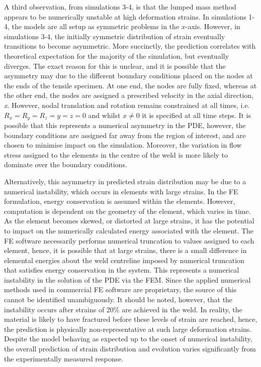 A third observation, from simulations 3-4, is that the lumped mass method appears to be numerically unstable at high deformation strains. In simulations 1-4, the models are all setup as symmetric problems in the $x$-axis. However, in simulations 3-4, the initially symmetric distribution of strain eventually transitions to become asymmetric. More succinctly, the prediction correlates with theoretical expectation for the majority of the simulation, but eventually diverges. The exact reason for this is unclear, and it is possible that the asymmetry may due to the different boundary conditions placed on the nodes at the ends of the tensile specimen. At one end, the nodes are fully fixed, whereas at the other end, the nodes are assigned a prescribed velocity in the axial direction, \textit{x}. However, nodal translation and rotation remains constrained at all times, i.e. $R_x = R_y = R_z = y = z = 0$ and whilst $x \ne 0$ it is specified at all time steps. It is possible that this represents a numerical asymmetry in the PDE, however, the boundary conditions are assigned far away from the region of interest, and are chosen to minimise impact on the simulation. Moreover, the variation in flow stress assigned to the elements in the centre of the weld is more likely to dominate over the boundary conditions. 

Alternatively, this asymmetry in predicted strain distribution may be due to a numerical instability, which occurs in elements with large strains. In the FE formulation, energy conservation is assumed within the elements. However, computation is dependent on the geometry of the element, which varies in time. As the element becomes skewed, or distorted at large strains, it has the potential to impact on the numerically calculated energy associated with the element. The FE software necessarily performs numerical truncation to values assigned to each element, hence, it is possible that at large strains, there is a small difference in elemental energies about the weld centreline imposed by numerical truncation that satisfies energy conservation in the system. This represents a numerical instability in the solution of the PDE via the FEM. Since the applied numerical methods used in commercial FE software are proprietary, the source of this cannot be identified unambiguously. It should be noted, however, that the instability occurs after strains of 20\% are achieved in the weld. In reality, the material is likely to have fractured before these levels of strain are reached, hence, the prediction is physically non-representative at such large deformation strains. Despite the model behaving as expected up to the onset of numerical instability, the overall prediction of strain distribution and evolution varies significantly from the experimentally measured response.

